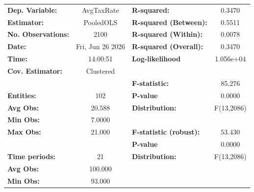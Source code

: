 \begin{center}
\begin{tabular}{lclc}
\toprule
\textbf{Dep. Variable:}                            &     AvgTaxRate     & \textbf{  R-squared:         }   &      0.3470      \\
\textbf{Estimator:}                                &     PooledOLS      & \textbf{  R-squared (Between):}  &      0.5511      \\
\textbf{No. Observations:}                         &        2100        & \textbf{  R-squared (Within):}   &      0.0078      \\
\textbf{Date:}                                     &  Fri, Jun 26 2026  & \textbf{  R-squared (Overall):}  &      0.3470      \\
\textbf{Time:}                                     &      14:00:51      & \textbf{  Log-likelihood     }   &    1.056e+04     \\
\textbf{Cov. Estimator:}                           &     Clustered      & \textbf{                     }   &                  \\
\textbf{}                                          &                    & \textbf{  F-statistic:       }   &      85.276      \\
\textbf{Entities:}                                 &        102         & \textbf{  P-value            }   &      0.0000      \\
\textbf{Avg Obs:}                                  &       20.588       & \textbf{  Distribution:      }   &    F(13,2086)    \\
\textbf{Min Obs:}                                  &       7.0000       & \textbf{                     }   &                  \\
\textbf{Max Obs:}                                  &       21.000       & \textbf{  F-statistic (robust):} &      53.430      \\
\textbf{}                                          &                    & \textbf{  P-value            }   &      0.0000      \\
\textbf{Time periods:}                             &         21         & \textbf{  Distribution:      }   &    F(13,2086)    \\
\textbf{Avg Obs:}                                  &      100.000       & \textbf{                     }   &                  \\
\textbf{Min Obs:}                                  &       93.000       & \textbf{                     }   &                  \\

\end{tabular}
\end{center}
